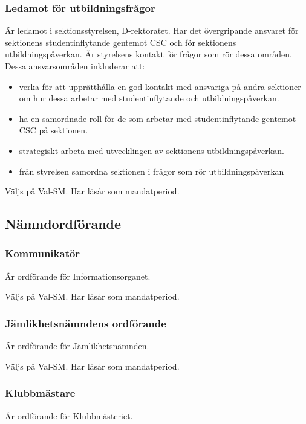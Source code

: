 \documentclass{dgovdoc}
\begin{document}
\subsubsection{Ledamot för utbildningsfrågor}

Är ledamot i sektionsstyrelsen, D-rektoratet. Har det övergripande ansvaret för sektionens
studentinflytande gentemot CSC och för sektionens utbildningspåverkan. Är
styrelsens kontakt för frågor som rör dessa områden.
Dessa ansvarsområden inkluderar att:
\begin{itemize}
	\item verka för att upprätthålla en god kontakt med ansvariga på andra sektioner om hur dessa arbetar med studentinflytande och utbildningspåverkan.
	\item ha en samordnade roll för de som arbetar med studentinflytande gentemot CSC på sektionen.
	\item strategiskt arbeta med utvecklingen av sektionens utbildningspåverkan.
	\item från styrelsen samordna sektionen i frågor som rör utbildningspåverkan
\end{itemize}

Väljs på Val-SM. Har läsår som mandatperiod.

\subsection{Nämndordförande}

\subsubsection{Kommunikatör}

Är ordförande för Informationsorganet.

Väljs på Val-SM. Har läsår som mandatperiod.

\subsubsection{Jämlikhetsnämndens ordförande}

Är ordförande för Jämlikhetsnämnden.

Väljs på Val-SM. Har läsår som mandatperiod.

\subsubsection{Klubbmästare}

Är ordförande för Klubbmästeriet.
\end{document}
